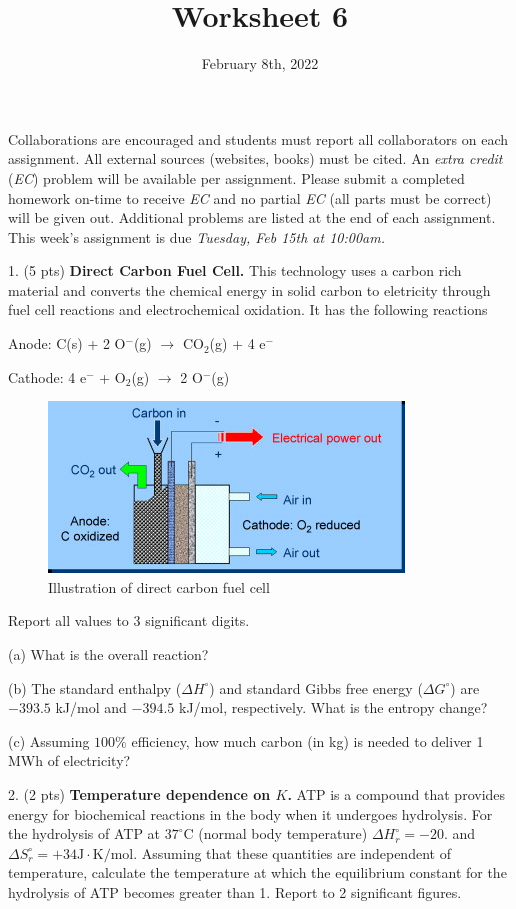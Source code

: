 \documentclass[11pt]{article}
\title{\textbf{Worksheet 6}}
\date{\vspace{-2em}February 8th, 2022}
\begin{document}
\maketitle

Collaborations are encouraged and students must report all collaborators
on each assignment. All external sources (websites, books) must be
cited. An \textit{extra credit} (\textit{EC}) problem will be available per
assignment. Please submit a completed homework on-time to receive \textit{EC}
and no partial \textit{EC} (all parts must be correct) will be given out.
Additional problems are listed at the end of each assignment. This week's
assignment is due \textit{Tuesday, Feb 15th at 10:00am.}

1. (5 pts) \textbf{Direct Carbon Fuel Cell.} This technology uses a carbon rich
material and converts the chemical energy in solid carbon to eletricity through
fuel cell reactions and electrochemical oxidation. It has the following reactions

  Anode: C(s) + 2 O$^-$(g) $\rightarrow$ CO$_2$(g) + 4 e$^-$

  Cathode: 4 e$^-$ + O$_2$(g) $\rightarrow$ 2 O$^-$(g)

\begin{figure}[hbpt]
  \centering
  \includegraphics[scale=1]{direct_carbon.jpg}
  \caption{Illustration of direct carbon fuel cell}
\end{figure}
Report all values to 3 significant digits.

(a) What is the overall reaction?

(b) The standard enthalpy ($\Delta H^\circ$) and standard Gibbs
free energy ($\Delta G^\circ$) are $-393.5$ kJ/mol and $-394.5$ kJ/mol,
respectively. What is the entropy change?

(c) Assuming $100\%$ efficiency, how much carbon (in kg) is needed to deliver
1 MWh of electricity?

\pagebreak

2. (2 pts) \textbf{Temperature dependence on $K$.} ATP is a compound that provides energy
for biochemical reactions in the body when it undergoes hydrolysis. For the hydrolysis
of ATP at $37^\circ\text{C}$ (normal body temperature) $\Delta H^\circ_r = -20.$ and
$\Delta S_r^\circ = +34 \text{J}\cdot\text{K/mol}$. Assuming that these quantities are independent
of temperature, calculate the temperature at which the equilibrium constant for the
hydrolysis of ATP becomes greater than 1. Report to 2 significant figures.
\end{document}

